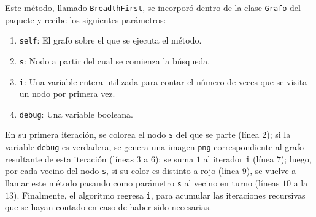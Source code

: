 \documentclass{article}
\begin{document}
  Este método, llamado \texttt{BreadthFirst}, se incorporó dentro de la clase \texttt{Grafo} del paquete y recibe los siguientes parámetros:
  \begin{enumerate}
    \item \texttt{self}: El grafo sobre el que se ejecuta el método.
    \item \texttt{s}: Nodo a partir del cual se comienza la búsqueda.
    \item \texttt{i}: Una variable entera utilizada para contar el número de veces que se visita un nodo por primera vez.
    \item \texttt{debug}: Una variable booleana.
  \end{enumerate}

  En su primera iteración, se colorea el nodo \texttt{s} del que se parte (línea $2$); si la variable \texttt{debug} es verdadera, se genera una imagen \texttt{png} correspondiente al grafo resultante de esta iteración (líneas $3$ a $6$); se suma $1$ al iterador \texttt{i} (línea $7$); luego, por cada vecino del nodo \texttt{s}, si su color es distinto a rojo (línea $9$), se vuelve a llamar este método pasando como parámetro \texttt{s} al vecino en turno (líneas $10$ a la $13$). Finalmente, el algoritmo regresa \texttt{i}, para acumular las iteraciones recursivas que se hayan contado en caso de haber sido necesarias.

  
  
\end{document}
